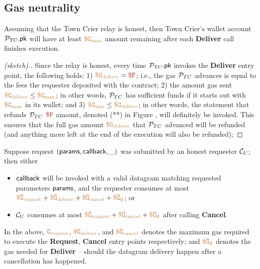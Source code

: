 \subsection{Gas neutrality}

\begin{theorem}
Assuming that the Town Crier relay is honest, 
then Town Crier's wallet account ${\mathcal{P}}_{\text{TC}}.{\sf pk}$ 
will have at least $\tt {\color{brown} \$ G_{\text{max}} }$
amount remaining after each {\bf Deliver}  
call finishes execution.
\end{theorem}
\begin{proof}[(sketch).]
Since the relay is honest, every time 
${\mathcal{P}}_{\text{TC}}.{\sf pk}$ invokes the {\bf Deliver}
entry point, the following holds:
1) 
$\sbrown{\$ G_{\text{deliver}}}
= \smaroon{\$ F}$;
i.e., the gas ${\cal P}_{TC}$ advances is equal
to the fees the 
requester deposited with the \tcont contract;
2)
the amount gas sent 
$\tt {\color{brown} \$ G_{\text{deliver}} } 
\leq 
\tt {\color{brown} \$ G_{\text{max}} } 
$;
in other words, 
${\cal P}_{TC}$ has sufficient funds  
if it starts out with $\tt {\color{brown} \$ G_{\text{max}} }$
in its wallet;
and
3) 
$\tt {\color{brown} \$ G_{\text{min}} } \leq
\tt {\color{brown} \$ G_{\text{deliver}} }$; in other words, the statement that refunds
${\cal P}_{TC}$ 
$\smaroon{\$ F}$
amount, denoted (**) in Figure , will definitely be invoked. This 
ensures that the full gas amount 
$\tt {\color{brown} \$ G_{\text{deliver}} }$
that ${\cal P}_{TC}$ advanced will be refunded (and anything more left
at the end of the execution will also be refunded);
\end{proof}





\begin{theorem}
Suppose request $({\sf params}, {\sf callback}, \_)$ was submitted
by an honest requester ${\cal C}_U$;
then 
either 
\begin{itemize}[leftmargin=5mm]
\item ${\sf callback}$ will be invoked  
with a valid datagram matching requested parameters
${\sf params}$,
and the requester consumes at most
$\tt {\color{brown} \$ \overline{G}_{\text{request}} } + \tt {\color{brown} \$ \overline{G}_{\text{deliver}} } + 
\tt {\color{brown} \$ \overline{G}_{\text{cancel}} }
+ \tt {\color{brown} \$ \overline{G}_{\emptyset} }$;
or 
\item
${\cal C}_U$ 
consumes at most 
$\tt {\color{brown} \$ \overline{G}_{\text{request}} } + \tt {\color{brown} \$ \overline{G}_{\text{cancel}} } + 
\tt {\color{brown} \$ \overline{G}_{\emptyset} }$ after calling {\bf Cancel}.
\end{itemize}
In the above, $\tt {\color{brown} \overline{G}_{\text{request}} }$,
$\tt {\color{brown} \$ \overline{G}_{\text{deliver}} }$,
and $\tt {\color{brown} \$ \overline{G}_{\text{cancel}} }$ 
denotes the maximum gas required
to execute the {\bf Request}, {\bf Cancel} entry points respectively;
and $\tt {\color{brown} \$ \overline{G}_{\emptyset} }$ denotes the 
gas needed for {\bf Deliver} -- should the datagram delivery
happen after a cancellation has happened.
\end{theorem}

